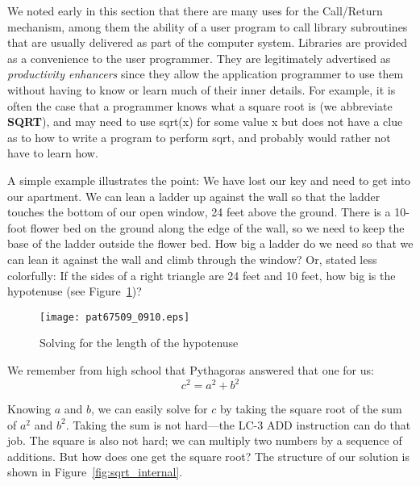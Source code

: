 \documentclass{patt}
\begin{document}
We noted early in this section that there are many uses for the
Call/Return mechanism, among them the ability of a user program to
call library subroutines that are usually delivered as part of the
computer system.  Libraries are provided as a convenience to the user
programmer.  They are legitimately advertised as {\em productivity
enhancers} since they allow the application programmer to use them without
having to know or learn much of their inner details.  For example, it is
often the case that a programmer knows what a square root is (we abbreviate 
{\bf SQRT}), and may need to use sqrt(x) for some value x but does not
have a clue as to how to write a program to perform sqrt, and probably would
rather not have to learn how.

A simple example illustrates the point: We have lost our key and need
to get into our apartment.  We can lean a ladder up against the wall
so that the ladder touches the bottom of our open window, 24 feet
above the ground.  There is a 10-foot flower bed on the ground along
the edge of the wall, so we need to keep the base of the ladder
outside the flower bed.  How big a ladder do we need so that we can
lean it against the wall and climb through the window?  Or, stated
less colorfully: If the sides of a right triangle are 24 feet and 10
feet, how big is the hypotenuse (see Figure~\ref{fig:24_10_26})?

\begin{figure}[h]
\centerline{\texttt{[image: pat67509\_0910.eps]}}
\caption{Solving for the length of the hypotenuse}
\label{fig:24_10_26}
\end{figure}

We remember from high school that Pythagoras answered that one for
us:
\begin{equation*}
c^2 = a^2 + b^2
\end{equation*}

\noindent Knowing $a$ and $b$, we can easily solve for $c$ by taking
the square root of the sum of $a^2$ and $b^2$. Taking the sum is not
hard---the LC-3 ADD instruction can do that job. The square is also
not hard; we can multiply two numbers by a sequence of additions.  But
how does one get the square root? The structure of our solution is
shown in Figure~\ref{fig:sqrt_internal}.
\end{document}
